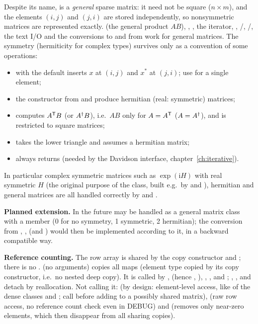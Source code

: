 Despite its name,  is a \emph{general} sparse matrix: it need not be square ($n\times m$),
and the elements $(i,j)$ and $(j,i)$ are stored independently, so nonsymmetric matrices are represented
exactly.  (the general product $AB$), , , the iterator, ,
/, /, the text I/O and the conversions to and from 
work for general matrices. The symmetry (hermiticity for complex types) survives only as a convention of some operations:
\begin{itemize}
\item {} with the default  inserts $x$ at $(i,j)$ and $x^*$ at $(j,i)$; use
   for a single element;
\item the constructor from  and  produce hermitian (real: symmetric) matrices;
\item {} computes $A^{\mathsf T} B$ (or $A^{\dagger} B$), i.e.\ $AB$ only for $A=A^{\mathsf T}$ ($A=A^{\dagger}$), and is restricted to square matrices;
\item {} takes the lower triangle and assumes a hermitian matrix;
\item {} always returns  (needed by the Davidson interface, chapter~\ref{ch:iterative}).
\end{itemize}
In particular complex symmetric matrices such as $\exp(\mathrm{i}H)$ with real symmetric $H$ (the original purpose of
the class, built e.g.\ by  and ), hermitian and general matrices are all handled correctly
by  and .

\textbf{Planned extension.} In the future  may be handled as a general matrix class with a member
 (0 for no symmetry, 1 symmetric, 2 hermitian); the conversion from , ,
 (and ) would then be implemented according to it, in a backward compatible way.

\textbf{Reference counting.} The row array is shared by the copy constructor and ; there is no
.  (no arguments) copies all maps (element type copied by its copy
constructor, i.e.\ no nested deep copy). It is called by ,  (hence \code{+=}, \code{-=}),
, ,  and ;
, ,  and  detach by reallocation. Not calling it:
 (by design: element-level access, like  of the dense classes and ;
call  before adding to a possibly shared matrix),  (raw row access, no reference count check
even in DEBUG) and  (removes only near-zero elements, which then disappear from all sharing
copies).

